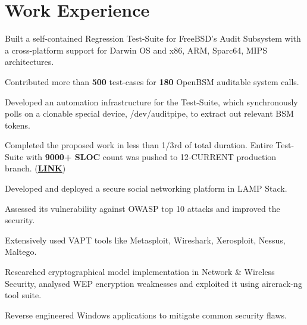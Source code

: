 \documentclass[]{deedy-resume-openfont}
\begin{document}
\begin{minipage}[t]{0.70\textwidth}

\vspace{-0.5cm}
\section{Work Experience}
\vspace{\topsep} %
\begin{tightemize}
\item Built a self-contained Regression Test-Suite for FreeBSD's Audit Subsystem with a cross-platform support for Darwin OS and x86, ARM, Sparc64, MIPS architectures.
  \item Contributed more than \textbf{500} test-cases for \textbf{180} OpenBSM auditable system calls.
  \item Developed an automation infrastructure for the Test-Suite, which synchronously polls on a clonable special device, /dev/auditpipe, to extract out relevant BSM tokens.
  \item	Completed the proposed work in less than 1/3rd of total duration. Entire Test-Suite with \textbf{9000+ SLOC} count was pushed to 12-CURRENT production branch. (\href{https://github.com/freebsd/freebsd/tree/master/tests/sys/audit}{\textbf{LINK}})
\end{tightemize}

\vspace{0.1cm}
\vspace{0cm} %
\begin{tightemize}
  \item Developed and deployed a secure social networking platform in LAMP Stack.
  \item Assessed its vulnerability against OWASP top 10 attacks and improved the security.
  \item Extensively used VAPT tools like Metasploit, Wireshark, Xerosploit, Nessus, Maltego.
  \item	Researched cryptographical model implementation in Network \& Wireless Security, analysed WEP encryption weaknesses and exploited it using aircrack-ng tool suite.
  \item Reverse engineered Windows applications to mitigate common security flaws.
\end{tightemize}




\end{minipage}
\end{document}
